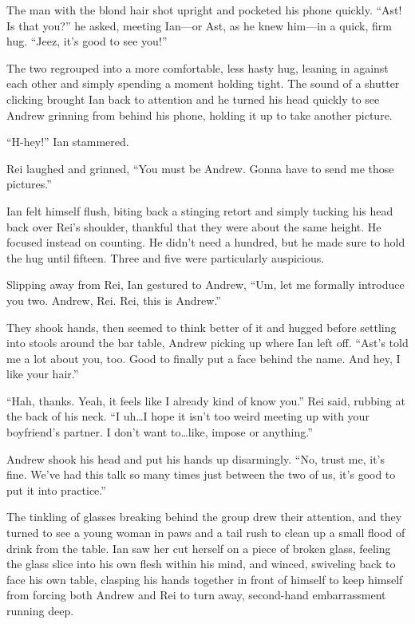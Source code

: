 The man with the blond hair shot upright and pocketed his phone quickly. ``Ast! Is that you?'' he asked, meeting Ian---or Ast, as he knew him---in a quick, firm hug. ``Jeez, it's good to see you!''

The two regrouped into a more comfortable, less hasty hug, leaning in against each other and simply spending a moment holding tight. The sound of a shutter clicking brought Ian back to attention and he turned his head quickly to see Andrew grinning from behind his phone, holding it up to take another picture.

``H-hey!'' Ian stammered.

Rei laughed and grinned, ``You must be Andrew. Gonna have to send me those pictures.''

Ian felt himself flush, biting back a stinging retort and simply tucking his head back over Rei's shoulder, thankful that they were about the same height. He focused instead on counting. He didn't need a hundred, but he made sure to hold the hug until fifteen. Three and five were particularly auspicious.

Slipping away from Rei, Ian gestured to Andrew, ``Um, let me formally introduce you two. Andrew, Rei. Rei, this is Andrew.''

They shook hands, then seemed to think better of it and hugged before settling into stools around the bar table, Andrew picking up where Ian left off. ``Ast's told me a lot about you, too. Good to finally put a face behind the name. And hey, I like your hair.''

``Hah, thanks. Yeah, it feels like I already kind of know you.'' Rei said, rubbing at the back of his neck. ``I uh\ldots{}I hope it isn't too weird meeting up with your boyfriend's partner. I don't want to\ldots{}like, impose or anything.''

Andrew shook his head and put his hands up disarmingly. ``No, trust me, it's fine. We've had this talk so many times just between the two of us, it's good to put it into practice.''

The tinkling of glasses breaking behind the group drew their attention, and they turned to see a young woman in paws and a tail rush to clean up a small flood of drink from the table. Ian saw her cut herself on a piece of broken glass, feeling the glass slice into his own flesh within his mind, and winced, swiveling back to face his own table, clasping his hands together in front of himself to keep himself from forcing both Andrew and Rei to turn away, second-hand embarrassment running deep.

